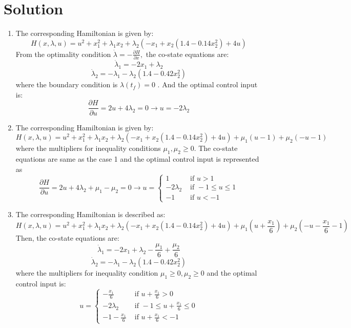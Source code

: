 \documentclass[10pt,a4paper,oneside]{article}
\begin{document}
\section* {Solution} 
\begin{enumerate}
\item The corresponding Hamiltonian is given by:
\[
H(x, \lambda, u)=u^{2}+x_{1}^{2}+\lambda_{1} x_{2}+\lambda_{2}\left(-x_{1}+x_{2}\left(1.4-0.14 x_{2}^{2}\right)+4 u\right)
\]
From the optimality condition $\dot{\lambda}=-\frac{\partial H}{\partial x},$ the co-state equations are:
\[
\dot{\lambda}_{1}=-2 x_{1}+\lambda_{2}
\]
\[
\dot{\lambda}_{2}=-\lambda_{1}-\lambda_{2}\left(1.4-0.42 x_{2}^{2}\right)
\]
where the boundary condition is $\lambda\left(t_{f}\right)=0$ . And the optimal control input is:
\[
\frac{\partial H}{\partial u}=2 u+4 \lambda_{2}=0 \rightarrow u=-2 \lambda_{2}
\]
\item The corresponding Hamiltonian is given by:
\[
H(x, \lambda, u)=u^{2}+x_{1}^{2}+\lambda_{1} x_{2}+\lambda_{2}\left(-x_{1}+x_{2}\left(1.4-0.14 x_{2}^{2}\right)+4 u\right)+\mu_{1}(u-1)+\mu_{2}(-u-1)
\]
where the multipliers for inequality conditions $\mu_{1}, \mu_{2} \geq 0 .$ The co-state equations are same as the case 1 and the optimal control input is represented as
\[
\frac{\partial H}{\partial u}=2 u+4 \lambda_{2}+\mu_{1}-\mu_{2}=0 \rightarrow u=\left\{\begin{array}{ll}{1} & {\text { if } u>1} \\ {-2 \lambda_{2}} & {\text { if }-1 \leq u \leq 1} \\ {-1} & {\text { if } u<-1}\end{array}\right.
\]
\item The corresponding Hamiltonian is described as:
\[
H(x, \lambda, u)=u^{2}+x_{1}^{2}+\lambda_{1} x_{2}+\lambda_{2}\left(-x_{1}+x_{2}\left(1.4-0.14 x_{2}^{2}\right)+4 u\right)+\mu_{1}\left(u+\frac{x_{1}}{6}\right)+\mu_{2}\left(-u-\frac{x_{1}}{6}-1\right)
\]
Then, the co-state equations are:
\[
\dot{\lambda}_{1}=-2 x_{1}+\lambda_{2}-\frac{\mu_{1}}{6}+\frac{\mu_{2}}{6}
\]
\[
\dot{\lambda}_{2}=-\lambda_{1}-\lambda_{2}\left(1.4-0.42 x_{2}^{2}\right)
\]
where the multipliers for inequality condition $\mu_{1} \geq 0, \mu_{2} \geq 0$ and the optimal control input is:
\[
u=\left\{\begin{array}{rr}{-\frac{x_{1}}{6}} & {\text { if } u+\frac{x_{1}}{6}>0} \\ {-2 \lambda_{2}} & {\text { if }-1 \leq u+\frac{x_{1}}{6} \leq 0} \\ {-1-\frac{x_{1}}{6}} & {\text { if } u+\frac{x_{1}}{6}<-1}\end{array}\right.
\]
\end{enumerate}
\end{document}
